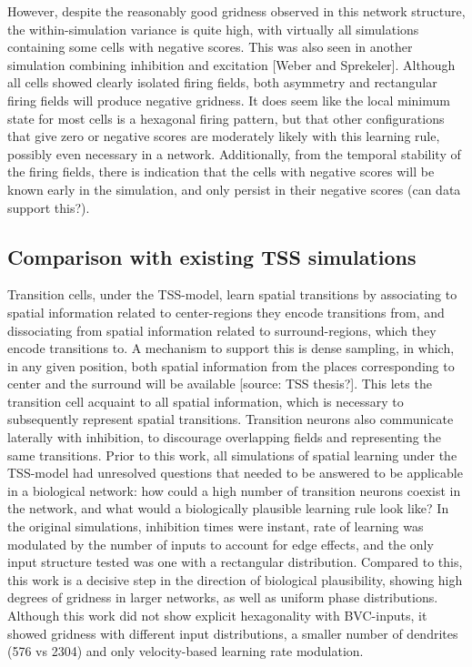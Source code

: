 \documentclass{article}
\begin{document}
    However, despite the reasonably good gridness observed in this network structure, the within-simulation variance is quite high, with virtually all simulations containing some cells with negative scores. This was also seen in another simulation combining inhibition and excitation [Weber and Sprekeler]. Although all cells showed clearly isolated firing fields, both asymmetry and rectangular firing fields will produce negative gridness. It does seem like the local minimum state for most cells is a hexagonal firing pattern, but that other configurations that give zero or negative scores are moderately likely with this learning rule, possibly even necessary in a network. Additionally, from the temporal stability of the firing fields, there is indication that the cells with negative scores will be known early in the simulation, and only persist in their negative scores (can data support this?).


    \subsection{Comparison with existing TSS simulations}

    Transition cells, under the TSS-model, learn spatial transitions by associating to spatial information related to center-regions they encode transitions from, and dissociating from spatial information related to surround-regions, which they encode transitions to. A mechanism to support this is dense sampling, in which, in any given position, both spatial information from the places corresponding to center and the surround will be available [source: TSS thesis?]. This lets the transition cell acquaint to all spatial information, which is necessary to subsequently represent spatial transitions. Transition neurons also communicate laterally with inhibition, to discourage overlapping fields and representing the same transitions. 
    Prior to this work, all simulations of spatial learning under the TSS-model had unresolved questions that needed to be answered to be applicable in a biological network: how could a high number of transition neurons coexist in the network, and what would a biologically plausible learning rule look like? In the original simulations, inhibition times were instant, rate of learning was modulated by the number of inputs to account for edge effects, and the only input structure tested was one with a rectangular distribution.
    Compared to this, this work is a decisive step in the direction of biological plausibility, showing high degrees of gridness in larger networks, as well as uniform phase distributions. Although this work did not show explicit hexagonality with BVC-inputs, it showed gridness with different input distributions, a smaller number of dendrites (576 vs 2304) and only velocity-based learning rate modulation.
\end{document}
